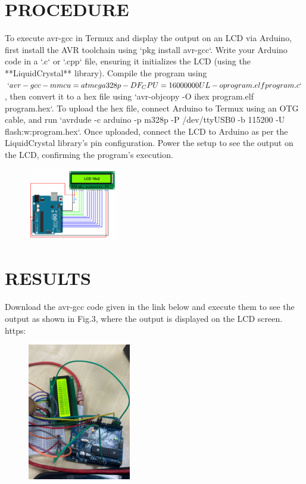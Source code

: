 \documentclass[conference]{IEEEtran}
\begin{document}
\section{PROCEDURE}
To execute avr-gcc in Termux and display the output on an LCD via Arduino, first install the AVR toolchain using `pkg install avr-gcc`. Write your Arduino code in a `.c` or `.cpp` file, ensuring it initializes the LCD (using the **LiquidCrystal** library). Compile the program using $`avr-gcc -mmcu=atmega328p -DF_CPU=16000000UL -o program.elf program.c`$, then convert it to a hex file using `avr-objcopy -O ihex program.elf program.hex`.
To upload the hex file, connect Arduino to Termux using an OTG cable, and run `avrdude -c arduino -p m328p -P /dev/ttyUSB0 -b 115200 -U flash:w:program.hex`. Once uploaded, connect the LCD to Arduino as per the LiquidCrystal library’s pin configuration. Power the setup to see the output on the LCD, confirming the program's execution.
 \begin{figure}[h]
	 \centering
	 \includegraphics[width=0.35\textwidth]{connec.png}
	 \caption{\label{fig:Connections}}
 \end{figure}
\section{RESULTS}
Download the avr-gcc code given in the link below and execute them to see the output as shown in Fig.3, where the output is displayed on the LCD screen.\\
 https:
\begin{figure}[h] 
	\centering 
	\includegraphics[width=0.4\textwidth]{avra.jpg}
	\caption{\label{fig:Result}}    
\end{figure}
\end{document}

